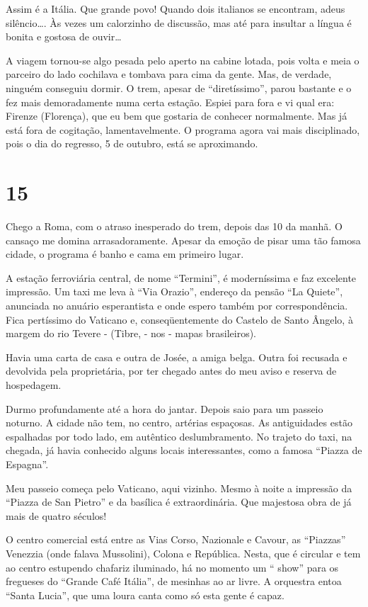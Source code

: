 Assim é a Itália. Que grande povo! Quando dois italianos se encontram, adeus silêncio\ldots. Às vezes um calorzinho de discussão, mas até para insultar a língua é bonita e gostosa de ouvir\ldots

A viagem tornou-se algo pesada pelo aperto na cabine lotada, pois volta e meia o parceiro do lado cochilava e tombava para cima da gente. Mas, de verdade, ninguém conseguiu dormir. O trem, apesar de ``diretíssimo'', parou bastante e o fez mais demoradamente numa certa estação. Espiei para fora e vi qual era: Firenze (Florença), que eu bem que gostaria de conhecer normalmente. Mas já está fora de cogitação, lamentavelmente. O programa agora vai mais disciplinado, pois o dia do regresso, 5 de outubro, está se aproximando.

\section*{15 \adfflatleafright {}}
Chego a Roma, com o atraso inesperado do trem, depois das 10 da manhã. O cansaço me domina arrasadoramente. Apesar da emoção de pisar uma tão famosa cidade, o programa é banho e cama em primeiro lugar.

A estação ferroviária central, de nome ``Termini'', é moderníssima e faz excelente impressão. Um taxi me leva à ``Via Orazio'', endereço da pensão ``La Quiete'', anunciada no anuário esperantista e onde espero também por correspondência. Fica pertíssimo do Vaticano e, conseqüentemente do Castelo de Santo Ângelo, à margem do rio Tevere - (Tibre, - nos - mapas brasileiros).

Havia uma carta de casa e outra de Josée, a amiga belga. Outra foi recusada e devolvida pela proprietária, por ter chegado antes do meu aviso e reserva de hospedagem.

Durmo profundamente até a hora do jantar. Depois saio para um passeio noturno. A cidade não tem, no centro, artérias espaçosas. As antiguidades estão espalhadas por todo lado, em autêntico deslumbramento. No trajeto do taxi, na chegada, já havia conhecido alguns locais interessantes, como a famosa ``Piazza de Espagna''.

Meu passeio começa pelo Vaticano, aqui vizinho. Mesmo à noite a impressão da ``Piazza de San Pietro'' e da basílica é extraordinária. Que majestosa obra de já mais de quatro séculos!

O centro comercial está entre as Vias Corso, Nazionale e Cavour, as ``Piazzas'' Venezzia (onde falava Mussolini), Colona e República. Nesta, que é circular e tem ao centro estupendo chafariz iluminado, há no momento um `` show'' para os fregueses do ``Grande Café Itália'', de mesinhas ao ar livre. A orquestra entoa ``Santa Lucia'', que uma loura canta como só esta gente é capaz.

